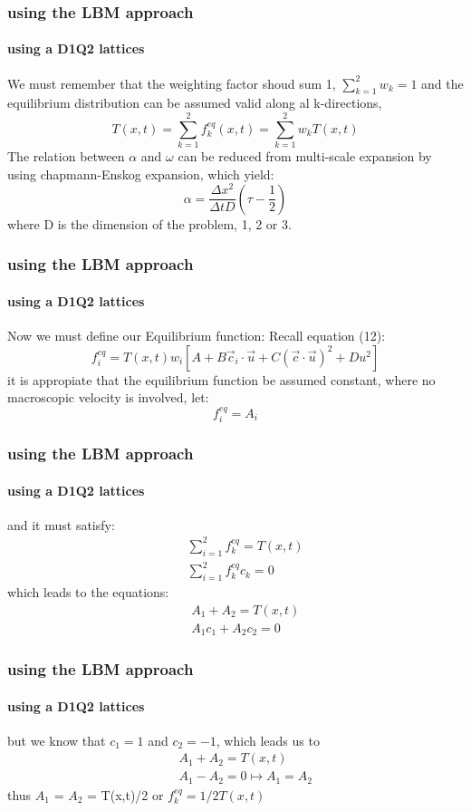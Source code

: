 \documentclass[12pt]{beamer}
\begin{document}
\begin{frame}
  \frametitle{using the LBM approach}
  \framesubtitle{using a D1Q2 lattices}
  We must remember that the weighting factor shoud sum 1, $\sum_{k=1}^{2} w_k = 1$ and the equilibrium
  distribution can be assumed valid along al k-directions,
  \begin{equation}
    T(x,t)=\sum_{k=1}^{2} f_k^{eq}(x,t)=\sum_{k=1}^{2} w_k T(x,t)
  \end{equation}
  The relation between $\alpha$ and $\omega$ can be reduced from multi-scale expansion by using 
  chapmann-Enskog expansion, which yield:
  \begin{equation}
    \alpha = \frac{\Delta x^2}{\Delta t D}(\tau - \frac{1}{2})
  \end{equation}
  where D is the dimension of the problem, 1, 2 or 3.
\end{frame}

\begin{frame}
  \frametitle{using the LBM approach}
  \framesubtitle{using a D1Q2 lattices}
  Now we must define our Equilibrium function:
  Recall equation (12):
  \begin{equation} \nonumber
    f_i^{eq}=T(x,t) w_i[A + B\vec{c}_i\cdot\vec{u}+ C(\vec{c}\cdot\vec{u})^2+ Du^2]
  \end{equation}
  it is appropiate that the equilibrium function be assumed constant, 
  where no macroscopic velocity is involved, let:
  \begin{equation}
    f_i^{eq}=A_i
  \end{equation}
\end{frame}

\begin{frame}
  \frametitle{using the LBM approach}
  \framesubtitle{using a D1Q2 lattices}
  and it must satisfy:
  \begin{eqnarray}
    && \sum_{i=1}^{2}f_k^{eq}=T(x,t) \\
    && \sum_{i=1}^{2}f_k^{eq}c_k=0
  \end{eqnarray}
which leads to the equations:
  \begin{eqnarray}
    && A_1+A_2 = T(x,t) \\
    && A_1 c_1+A_2 c_2 = 0
  \end{eqnarray}
\end{frame}

\begin{frame}
  \frametitle{using the LBM approach}
  \framesubtitle{using a D1Q2 lattices}
  but we know that $c_1 = 1$ and $c_2 = -1$, which leads us to
  \begin{eqnarray}
    && A_1+A_2 = T(x,t) \\
    && A_1-A_2 = 0 \mapsto A_1=A_2
  \end{eqnarray}
  thus $A_1$ = $A_2$ = T(x,t)/2 or $f_k^{eq} = 1/2 T(x,t)$
\end{frame}
\end{document}
